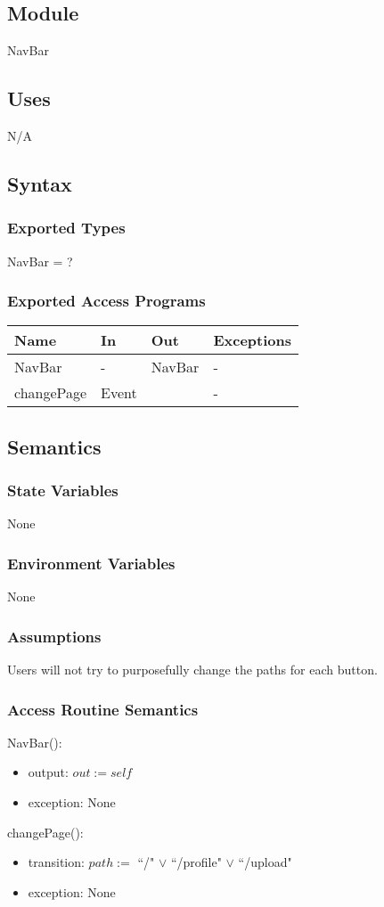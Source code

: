 \documentclass[12pt, titlepage]{article}
\begin{document}
\subsection{Module}
NavBar
\subsection{Uses}
N/A
\subsection{Syntax}
\subsubsection{Exported Types}
NavBar = ?
\subsubsection{Exported Access Programs}
\begin{center}
	\begin{tabular}{p{3cm} p{4cm} p{4cm} p{3cm}}
		\hline
		\textbf{Name} & \textbf{In} & \textbf{Out} & \textbf{Exceptions} \\
		\hline
		NavBar & - & NavBar & - \\
		changePage & Event &  & - \\
		\hline
	\end{tabular}
\end{center}
\subsection{Semantics}
\subsubsection{State Variables}
None
\subsubsection{Environment Variables}
None
\subsubsection{Assumptions}
Users will not try to purposefully change the paths for each button.
\subsubsection{Access Routine Semantics}
\noindent NavBar():
\begin{itemize}
	\item output: $out := self$ 
	\item exception: None
\end{itemize}
\noindent changePage():
\begin{itemize}
	\item transition: $path :=$ ``/" $\lor$ ``/profile" $\lor$ ``/upload" 
	\item exception: None
\end{itemize}
\end{document}
